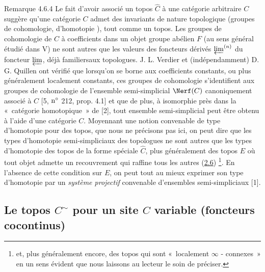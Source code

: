 \documentclass[10pt]{../fichiers-configuration-latex/smfart}
\begin{document}
\begin{enonce*}[remark]{Remarque 4.6.4}
Le fait d'avoir associé un topos $\widehat{C}$ à une catégorie
arbitraire $C$ suggère qu'une catégorie $C$ admet des invariants de
nature topologique (groupes de cohomologie, d'homotopie \etc), tout
comme un topos. Les groupes de cohomologie de $\widehat{C}$ à
coefficients dans un objet groupe abélien $F$ (au sens général
étudié dans V) ne sont autres que les valeurs des foncteurs
dérivés $\varprojlim^{(n)}$ du foncteur $\varprojlim$, déjà
familiers\pageoriginale aux topologues. J. L. Verdier et
(indépendamment) D. G. Quillen ont vérifié que lorsqu'on se borne
aux coefficients constants, ou plus généralement localement
constants, ces groupes de cohomologie s'identifient aux groupes de
cohomologie de l'ensemble semi-simplicial $\Nerf(C)$ canoniquement
associé à $C$ [5, ${\rm n^{\circ}}$ 212, prop. 4.1] et que de plus,
à isomorphie près dans la « catégorie homotopique » de [2], tout
ensemble semi-simplicial peut être obtenu à l'aide d'une catégorie
$C$. Moyennant une notion convenable de type d'homotopie pour des
topos, que nous ne précisons pas ici, on peut dire que les types
d'homotopie semi-simpliciaux des topologues ne sont autres 
que
les types d'homotopie des topos de la forme spéciale $\widehat{C}$,
plus généralement des topos $E$ où tout objet admette un
recouvrement qui raffine tous les autres (\hyperref[IV.subsec2.6]{2.6})
\footnote[1]{et, plus généralement encore, des topos qui sont « localement $\infty$ - connexes »  en un sens évident que nous
laissons au lecteur le soin de préciser.}. En l'absence de cette
condition sur $E$, on peut tout au mieux exprimer son type
d'homotopie par un \emph{système projectif} convenable d'ensembles
semi-simpliciaux [1].
\end{enonce*}

\subsection{Le topos $C^{\sim}$ pour un site $C$
variable (foncteurs cocontinus)}
\end{document}
